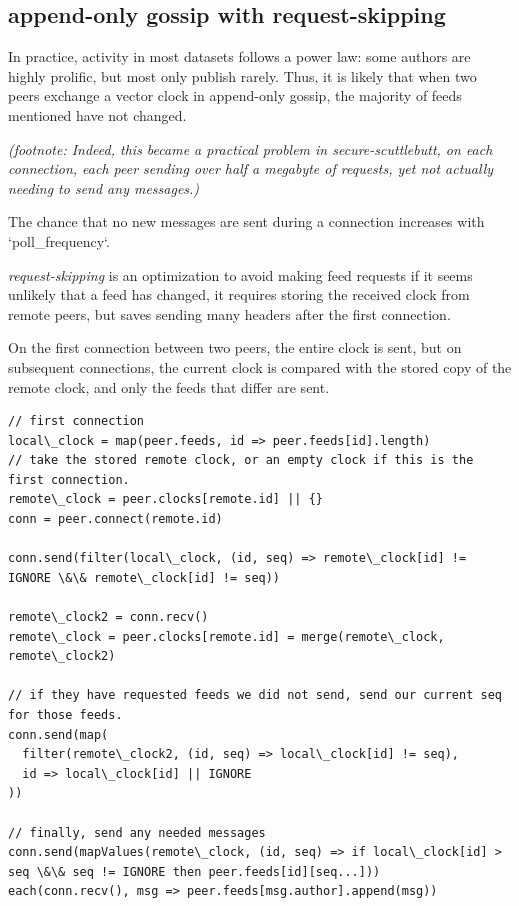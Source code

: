 \documentclass[sigconf]{acmart}
\begin{document}
\subsection{append-only gossip with request-skipping}

In practice, activity in most datasets follows a power law: some
authors are highly prolific, but most only publish rarely.  Thus, it
is likely that when two peers exchange a vector clock in append-only
gossip, the majority of feeds mentioned have not changed.

{\em (footnote: Indeed, this became a practical problem in secure-scuttlebutt,
on each connection, each peer sending over half a megabyte of requests,
yet not actually needing to send any messages.)}

The chance that no new messages are sent during a connection increases
with `poll\_frequency`.

{\em request-skipping} is an optimization to avoid making feed
requests if it seems unlikely that a feed has changed, it requires
storing the received clock from remote peers, but saves sending many
headers after the first connection.

On the first connection between two peers, the entire clock is sent,
but on subsequent connections, the current clock is compared with the
stored copy of the remote clock, and only the feeds that differ are
sent.

\begin{verbatim}
// first connection
local\_clock = map(peer.feeds, id => peer.feeds[id].length)
// take the stored remote clock, or an empty clock if this is the first connection.
remote\_clock = peer.clocks[remote.id] || {}
conn = peer.connect(remote.id)

conn.send(filter(local\_clock, (id, seq) => remote\_clock[id] != IGNORE \&\& remote\_clock[id] != seq))

remote\_clock2 = conn.recv()
remote\_clock = peer.clocks[remote.id] = merge(remote\_clock, remote\_clock2)

// if they have requested feeds we did not send, send our current seq for those feeds.
conn.send(map(
  filter(remote\_clock2, (id, seq) => local\_clock[id] != seq),
  id => local\_clock[id] || IGNORE
))

// finally, send any needed messages
conn.send(mapValues(remote\_clock, (id, seq) => if local\_clock[id] > seq \&\& seq != IGNORE then peer.feeds[id][seq...]))
each(conn.recv(), msg => peer.feeds[msg.author].append(msg))
\end{verbatim}
\end{document}
